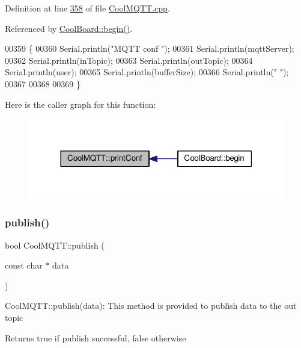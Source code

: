 Definition at line \hyperlink{_cool_m_q_t_t_8cpp_source_l00358}{358} of file \hyperlink{_cool_m_q_t_t_8cpp_source}{Cool\+M\+Q\+T\+T.\+cpp}.



Referenced by \hyperlink{_cool_board_8cpp_source_l00021}{Cool\+Board\+::begin()}.


\begin{DoxyCode}
00359 \{
00360     Serial.println(\textcolor{stringliteral}{"MQTT conf "});
00361     Serial.println(mqttServer);
00362     Serial.println(inTopic);
00363     Serial.println(outTopic);
00364     Serial.println(user);
00365     Serial.println(bufferSize);
00366     Serial.println(\textcolor{stringliteral}{" "});
00367 
00368 
00369 \}
\end{DoxyCode}
Here is the caller graph for this function\+:
\nopagebreak
\begin{figure}[H]
\begin{center}
\leavevmode
\includegraphics[width=318pt]{class_cool_m_q_t_t_a40553a0ad4b5ecf1cb4411ab54ca85fb_icgraph}
\end{center}
\end{figure}
\mbox{\label{class_cool_m_q_t_t_ace977b3e90ab14b1199fe5c4fb0a13ec}} 
\subsubsection{\texorpdfstring{publish()}{publish()}\hspace{0.1cm}{\footnotesize\ttfamily [1/2]}}
{\footnotesize\ttfamily bool Cool\+M\+Q\+T\+T\+::publish (\begin{DoxyParamCaption}\item[{const char $\ast$}]{data }\end{DoxyParamCaption})}

Cool\+M\+Q\+T\+T\+::publish(data)\+: This method is provided to publish data to the out topic

\begin{DoxyReturn}{Returns}
true if publish successful, false otherwise 
\end{DoxyReturn}


